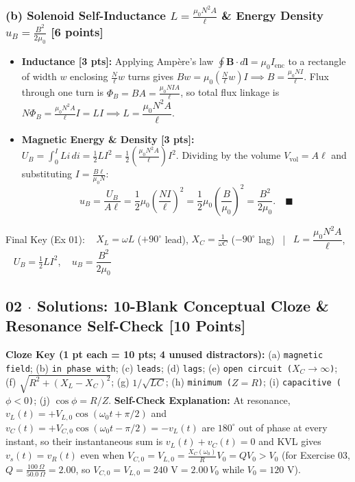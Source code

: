 \documentclass[10pt,letterpaper]{article}
\begin{document}
  \subsubsection*{(b) Solenoid Self-Inductance $L = \frac{\mu_0 N^2 A}{\ell}$ \& Energy Density $u_B = \frac{B^2}{2\mu_0}$ [6 points]}
  \begin{itemize}
    \item \textbf{Inductance [3 pts]:} Applying Amp\`ere's law $\oint \mathbf{B}\cdot d\mathbf{l} = \mu_0 I_{\text{enc}}$ to a rectangle of width $w$ enclosing $\frac{N}{\ell}w$ turns gives $B w = \mu_0 \left(\frac{N}{\ell}w\right)I \implies B = \frac{\mu_0 N I}{\ell}$. Flux through one turn is $\Phi_B = BA = \frac{\mu_0 N I A}{\ell}$, so total flux linkage is $N\Phi_B = \frac{\mu_0 N^2 A}{\ell}I = LI \implies L = \dfrac{\mu_0 N^2 A}{\ell}$.
    \item \textbf{Magnetic Energy \& Density [3 pts]:} $U_B = \int_0^I L i\,di = \frac{1}{2}LI^2 = \frac{1}{2}\left(\frac{\mu_0 N^2 A}{\ell}\right)I^2$. Dividing by the volume $V_{\text{vol}} = A\ell$ and substituting $I = \frac{B\ell}{\mu_0 N}$:
    $$u_B = \frac{U_B}{A\ell} = \frac{1}{2}\mu_0 \left(\frac{N I}{\ell}\right)^2 = \frac{1}{2}\mu_0 \left(\frac{B}{\mu_0}\right)^2 = \frac{B^2}{2\mu_0}. \quad \blacksquare$$
  \end{itemize}

Final Key (Ex 01): ~ $X_L = \omega L$ ($+90^\circ$ lead), $X_C = \frac{1}{\omega C}$ ($-90^\circ$ lag) ~|~ $L = \dfrac{\mu_0 N^2 A}{\ell}$, ~ $U_B = \frac{1}{2}LI^2$, ~ $u_B = \dfrac{B^2}{2\mu_0}$

\subsection*{02 $\cdot$ Solutions: 10-Blank Conceptual Cloze \& Resonance Self-Check \hfill [10 Points]}


  \textbf{Cloze Key (1 pt each = 10 pts; 4 unused distractors):} (a) \texttt{magnetic field}; (b) \texttt{in phase with}; (c) \texttt{leads}; (d) \texttt{lags}; (e) \texttt{open circuit ($X_C \to \infty$)}; (f) \texttt{$\sqrt{R^2 + (X_L - X_C)^2}$}; (g) \texttt{$1/\sqrt{LC}$}; (h) \texttt{minimum ($Z = R$)}; (i) \texttt{capacitive ($\phi < 0$)}; (j) \texttt{$\cos\phi = R/Z$}.
  \textbf{Self-Check Explanation:} At resonance, $v_L(t) = +V_{L,0}\cos(\omega_0 t + \pi/2)$ and $v_C(t) = +V_{C,0}\cos(\omega_0 t - \pi/2) = -v_L(t)$ are $180^\circ$ out of phase at every instant, so their instantaneous sum is $v_L(t) + v_C(t) = 0$ and KVL gives $v_s(t) = v_R(t)$ even when $V_{C,0} = V_{L,0} = \frac{X_C(\omega_0)}{R}V_0 = Q V_0 > V_0$ (for Exercise 03, $Q = \frac{100\ \Omega}{50.0\ \Omega} = 2.00$, so $V_{C,0} = V_{L,0} = 240\text{ V} = 2.00\,V_0$ while $V_0 = 120\text{ V}$).
\end{document}
